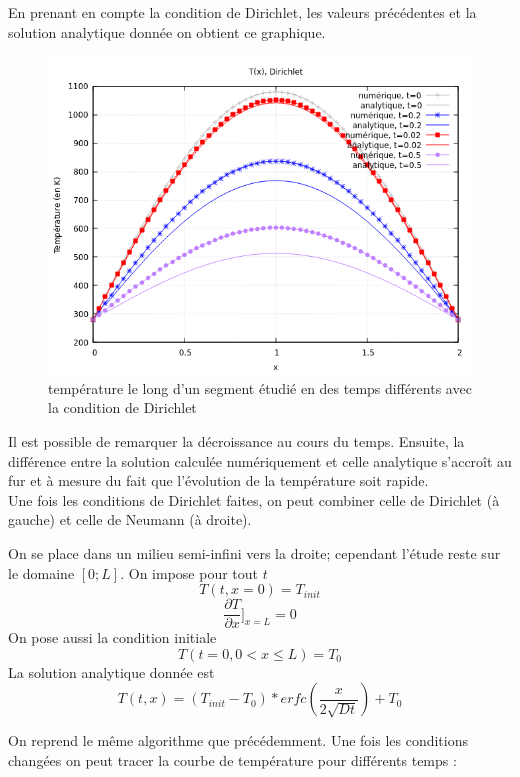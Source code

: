 \documentclass[a4paper,11pt]{article}
\begin{document}
En prenant en compte la condition de Dirichlet, les valeurs précédentes et la solution analytique donnée on obtient ce graphique.

\begin{figure}[H]
    \centering
    \includegraphics[width=0.8\linewidth]{images/graphe_temperature_grid.png}
    \caption{température le long d'un segment étudié en des temps différents avec la condition de Dirichlet}
\end{figure}

Il est possible de remarquer la décroissance au cours du temps. Ensuite, la différence entre la solution calculée numériquement et celle analytique s’accroît au fur et à mesure du fait que l'évolution de la température soit rapide. \\


Une fois les conditions de Dirichlet faites, on peut combiner celle de Dirichlet (à gauche) et celle de Neumann (à droite). 

On se place dans un milieu semi-infini vers la droite; cependant l'étude reste sur le domaine $[0;L]$. On impose pour tout $t$ $$T(t,x=0)=T_{init} $$ $$
\frac{\partial T}{\partial x}]_{x=L} = 0$$
On pose aussi la condition initiale  $$T(t=0, 0<x\leq L)=T_0 $$
La solution analytique donnée est $$ T(t,x) = (T_{init}-T_0)* erfc(\frac{x}{2\sqrt{Dt}})+T_0 $$

On reprend le même algorithme que précédemment. Une fois les conditions changées on peut tracer la courbe de température pour différents temps :
\end{document}
